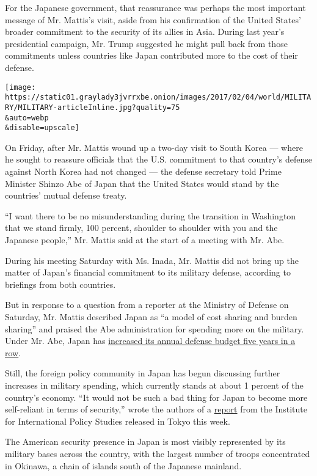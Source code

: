 For the Japanese government, that reassurance was perhaps the most
important message of Mr. Mattis's visit, aside from his confirmation of
the United States' broader commitment to the security of its allies in
Asia. During last year's presidential campaign, Mr. Trump suggested he
might pull back from those commitments unless countries like Japan
contributed more to the cost of their defense.

\texttt{[image: https://static01.graylady3jvrrxbe.onion/images/2017/02/04/world/MILITARY/MILITARY-articleInline.jpg?quality=75\\\&auto=webp\\\&disable=upscale]}

On Friday, after Mr. Mattis wound up a two-day visit to South Korea ---
where he sought to reassure officials that the U.S. commitment to that
country's defense against North Korea had not changed --- the defense
secretary told Prime Minister Shinzo Abe of Japan that the United States
would stand by the countries' mutual defense treaty.

``I want there to be no misunderstanding during the transition in
Washington that we stand firmly, 100 percent, shoulder to shoulder with
you and the Japanese people,'' Mr. Mattis said at the start of a meeting
with Mr. Abe.

During his meeting Saturday with Ms. Inada, Mr. Mattis did not bring up
the matter of Japan's financial commitment to its military defense,
according to briefings from both countries.

But in response to a question from a reporter at the Ministry of Defense
on Saturday, Mr. Mattis described Japan as ``a model of cost sharing and
burden sharing'' and praised the Abe administration for spending more on
the military. Under Mr. Abe, Japan has
\href{https://www.nytimes3xbfgragh.onion/2016/08/31/world/asia/japan-defense-military-budget-shinzo-abe.html}{increased
its annual defense budget five years in a row}.

Still, the foreign policy community in Japan has begun discussing
further increases in military spending, which currently stands at about
1 percent of the country's economy. ``It would not be such a bad thing
for Japan to become more self-reliant in terms of security,'' wrote the
authors of a
\href{http://www.iips.org/en/research/usjr2017en.pdf}{report} from the
Institute for International Policy Studies released in Tokyo this week.

The American security presence in Japan is most visibly represented by
its military bases across the country, with the largest number of troops
concentrated in Okinawa, a chain of islands south of the Japanese
mainland.

